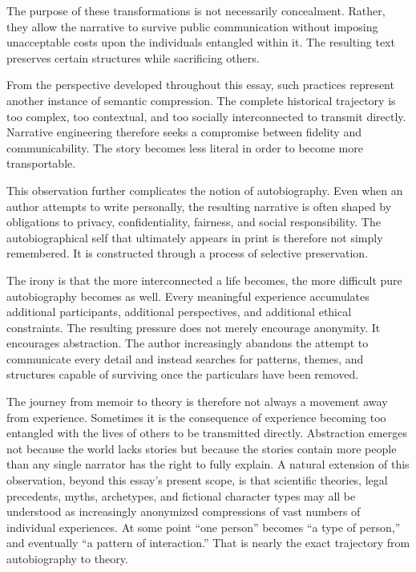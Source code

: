 \documentclass[11pt]{article}
\theoremstyle{plain}
\begin{document}
The purpose of these transformations is not necessarily concealment. Rather, they allow the narrative to survive public communication without imposing unacceptable costs upon the individuals entangled within it. The resulting text preserves certain structures while sacrificing others.

From the perspective developed throughout this essay, such practices represent another instance of semantic compression. The complete historical trajectory is too complex, too contextual, and too socially interconnected to transmit directly. Narrative engineering therefore seeks a compromise between fidelity and communicability. The story becomes less literal in order to become more transportable.

This observation further complicates the notion of autobiography. Even when an author attempts to write personally, the resulting narrative is often shaped by obligations to privacy, confidentiality, fairness, and social responsibility. The autobiographical self that ultimately appears in print is therefore not simply remembered. It is constructed through a process of selective preservation.

The irony is that the more interconnected a life becomes, the more difficult pure autobiography becomes as well. Every meaningful experience accumulates additional participants, additional perspectives, and additional ethical constraints. The resulting pressure does not merely encourage anonymity. It encourages abstraction. The author increasingly abandons the attempt to communicate every detail and instead searches for patterns, themes, and structures capable of surviving once the particulars have been removed.

The journey from memoir to theory is therefore not always a movement away from experience. Sometimes it is the consequence of experience becoming too entangled with the lives of others to be transmitted directly. Abstraction emerges not because the world lacks stories but because the stories contain more people than any single narrator has the right to fully explain. A natural extension of this observation, beyond this essay's present scope, is that scientific theories, legal precedents, myths, archetypes, and fictional character types may all be understood as increasingly anonymized compressions of vast numbers of individual experiences. At some point ``one person'' becomes ``a type of person,'' and eventually ``a pattern of interaction.'' That is nearly the exact trajectory from autobiography to theory.
\end{document}
